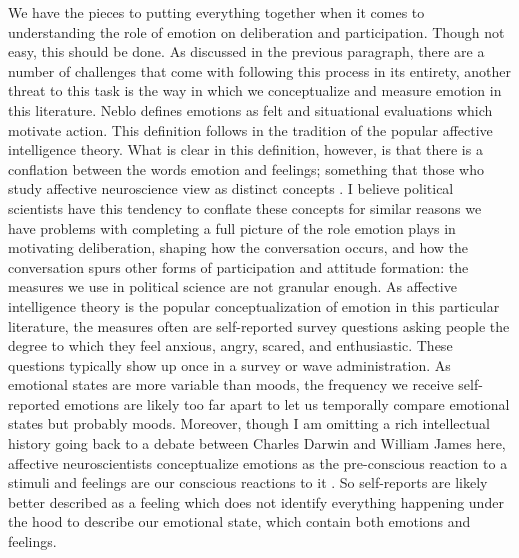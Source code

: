 \documentclass[12pt]{article}
\begin{document}
We have the pieces to putting everything together when it comes to understanding the role of emotion on deliberation and participation. Though not easy, this should be done. As discussed in the previous paragraph, there are a number of challenges that come with following this process in its entirety, another threat to this task is the way in which we conceptualize and measure emotion in this literature. Neblo \citep{neblo_2020_apsr} defines emotions as felt and situational evaluations which motivate action. This definition follows in the tradition of the popular affective intelligence theory. What is clear in this definition, however, is that there is a conflation between the words emotion and feelings; something that those who study affective neuroscience view as distinct concepts \citep{sander_2013_chhan,ralph_anderson_2018}. I believe political scientists have this tendency to conflate these concepts for similar reasons we have problems with completing a full picture of the role emotion plays in motivating deliberation, shaping how the conversation occurs, and how the conversation spurs other forms of participation and attitude formation: the measures we use in political science are not granular enough. As affective intelligence theory is the popular conceptualization of emotion in this particular literature, the measures often are self-reported survey questions asking people the degree to which they feel anxious, angry, scared, and enthusiastic. These questions typically show up once in a survey or wave administration. As emotional states are more variable than moods, the frequency we receive self-reported emotions are likely too far apart to let us temporally compare emotional states but probably moods. Moreover, though I am omitting a rich intellectual history going back to a debate between Charles Darwin and William James here, affective neuroscientists conceptualize emotions as the pre-conscious reaction to a stimuli and feelings are our conscious reactions to it \citep{sander_2013_chhan}. So self-reports are likely better described as a feeling which does not identify everything happening under the hood to describe our emotional state, which contain both emotions and feelings. 
\end{document}
